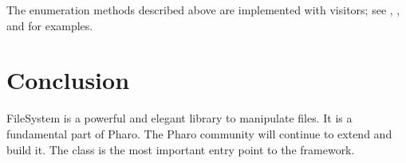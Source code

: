 \documentclass[a4paper,10pt,twoside]{book}
\begin{document}
The enumeration methods described above are implemented with visitors; see , , and  for examples.


\section{Conclusion}

FileSystem is a powerful and elegant library to manipulate files. It is a fundamental part of Pharo. The Pharo community will continue 
to extend and build it. The class  is the most important entry point to the framework.

\ifx\wholebook\relax\else
   
   
\end{document}
